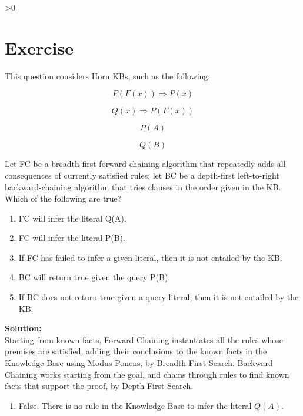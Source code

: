 \documentclass{article}
\newcounter{partCounter}
\newcounter{ExerciseCounter}
\newenvironment{Exercise}[1][-1]{
	\ifnum#1>0
	\setcounter{ExerciseCounter}{#1}
	\fi
	\section{Exercise \arabic{ExerciseCounter}}
	\setcounter{partCounter}{1}
}{
}
\newcommand{\solution}{\textbf{\large Solution:}}
\begin{document}
\newpage



\begin{Exercise}[3]

This question considers Horn KBs, such as the following:

\begin{equation}
P(F(x)) \Rightarrow P(x)
\end{equation}

\begin{equation}
Q(x) \Rightarrow P(F(x))
\end{equation}

\begin{equation}
P(A)
\end{equation}

\begin{equation}
Q(B)
\end{equation}

Let FC be a breadth-first forward-chaining algorithm that repeatedly adds all consequences of currently satisfied rules; let BC be a depth-first left-to-right
backward-chaining algorithm that tries clauses in the order given in the KB. \\

Which of the following are true? 

\begin{enumerate}
\item FC will infer the literal Q(A).
\item FC will infer the literal P(B).
\item If FC has failed to infer a given literal, then it is not entailed by the KB.
\item BC will return true given the query P(B).
\item If BC does not return true given a query literal, then it is not entailed by the KB.
\end{enumerate}
	
\solution \\
		
Starting from known facts, Forward Chaining instantiates all the rules whose premises are satisfied, adding their conclusions to the known facts in the Knowledge Base using Modus Ponens, by Breadth-First Search. Backward Chaining works starting from the goal, and chains through rules to find known facts that support the proof, by Depth-First Search. \\

\begin{enumerate}
	\item False. There is no rule in the Knowledge Base to infer the literal $Q(A)$.
	

\end{enumerate}
\end{Exercise}
\end{document}
